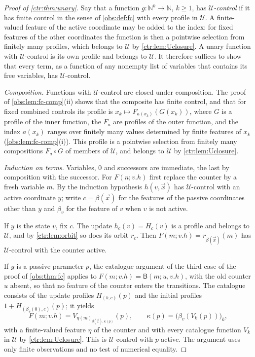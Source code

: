 \begin{proof}[Proof of \cref{ctr:thm:unary}]
Say that a function $g\colon\mathbb N^k\to\mathbb N$, $k\ge 1$, has \emph{$\mathcal U$-control}
if it has finite control in the sense of \cref{obs:def:fc} with every profile in
$\mathcal U$. A finite-valued feature of the active coordinate may be added to the index:
for fixed features of the other coordinates the function is then a pointwise selection from
finitely many profiles, which belongs to $\mathcal U$ by \cref{ctr:lem:Uclosure}. A unary
function with $\mathcal U$-control is its own profile and belongs to $\mathcal U$. It
therefore suffices to show that every term, as a function of any nonempty list of variables
that contains its free variables, has $\mathcal U$-control.

\emph{Composition.} Functions with $\mathcal U$-control are closed under composition. The
proof of \cref{obs:lem:fc-comp}(ii) shows that the composite has finite control, and that
for fixed combined controls its profile is $x_k\mapsto F_{a(x_k)}(G(x_k))$, where $G$ is a
profile of the inner function, the $F_a$ are profiles of the outer function, and the index
$a(x_k)$ ranges over finitely many values determined by finite features of $x_k$
(\cref{obs:lem:fc-comp}(i)). This profile is a pointwise selection from finitely many
compositions $F_a\circ G$ of members of $\mathcal U$, and belongs to $\mathcal U$ by
\cref{ctr:lem:Uclosure}.

\emph{Induction on terms.} Variables, $0$ and successors are immediate, the last by
composition with the successor. For $F(n;v.h)$ first replace the counter by a fresh
variable $m$. By the induction hypothesis $h(v,\vec x)$ has $\mathcal U$-control with an
active coordinate $y$; write $c=\beta(\vec x)$ for the features of the passive coordinates
other than $y$ and $\beta_v$ for the feature of $v$ when $v$ is not active.

If $y$ is the state $v$, fix $c$. The update $h_c(v)=H_c(v)$ is a profile and belongs to
$\mathcal U$, and by \cref{ctr:lem:orbit} so does its orbit $r_c$. Then
$F(m;v.h)=r_{\beta(\vec x)}(m)$ has $\mathcal U$-control with the counter active.

If $y$ is a passive parameter $p$, the catalogue argument of the third case of the proof of
\cref{obs:thm:fc} applies to $F(m;v.h)=\mathsf B(m;u,v.h)$, with the old counter $u$
absent, so that no feature of the counter enters the transitions. The catalogue consists of
the update profiles $H_{(b,c)}(p)$ and the initial profiles $1+H_{(\beta_v(0),c)}(p)$; it
yields
\[
 F(m;v.h)=V_{\eta(m)_{\beta(\vec x),\kappa(p)}}(p),\qquad
 \kappa(p)=\bigl(\beta_v(V_k(p))\bigr)_k,
\]
with a finite-valued feature $\eta$ of the counter and with every catalogue function $V_k$
in $\mathcal U$ by \cref{ctr:lem:Uclosure}. This is $\mathcal U$-control with $p$ active.
The argument uses only finite observations and no test of numerical equality.


\end{proof}

